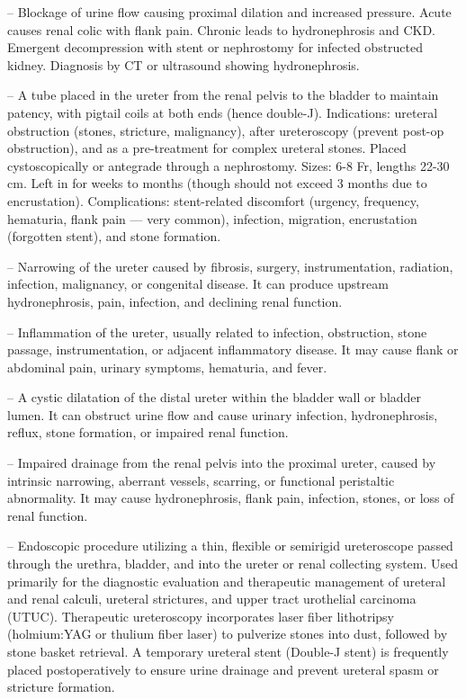 -- Blockage of urine flow causing proximal dilation and increased pressure. Acute causes renal colic with flank pain. Chronic leads to hydronephrosis and CKD. Emergent decompression with stent or nephrostomy for infected obstructed kidney. Diagnosis by CT or ultrasound showing hydronephrosis.

-- A tube placed in the ureter from the renal pelvis to the bladder to maintain patency, with pigtail coils at both ends (hence double-J). Indications: ureteral obstruction (stones, stricture, malignancy), after ureteroscopy (prevent post-op obstruction), and as a pre-treatment for complex ureteral stones. Placed cystoscopically or antegrade through a nephrostomy. Sizes: 6-8 Fr, lengths 22-30 cm. Left in for weeks to months (though should not exceed 3 months due to encrustation). Complications: stent-related discomfort (urgency, frequency, hematuria, flank pain — very common), infection, migration, encrustation (forgotten stent), and stone formation.

-- Narrowing of the ureter caused by fibrosis, surgery, instrumentation, radiation, infection, malignancy, or congenital disease. It can produce upstream hydronephrosis, pain, infection, and declining renal function.

-- Inflammation of the ureter, usually related to infection, obstruction, stone passage, instrumentation, or adjacent inflammatory disease. It may cause flank or abdominal pain, urinary symptoms, hematuria, and fever.


-- A cystic dilatation of the distal ureter within the bladder wall or bladder lumen. It can obstruct urine flow and cause urinary infection, hydronephrosis, reflux, stone formation, or impaired renal function.

-- Impaired drainage from the renal pelvis into the proximal ureter, caused by intrinsic narrowing, aberrant vessels, scarring, or functional peristaltic abnormality. It may cause hydronephrosis, flank pain, infection, stones, or loss of renal function.

-- Endoscopic procedure utilizing a thin, flexible or semirigid ureteroscope passed through the urethra, bladder, and into the ureter or renal collecting system. Used primarily for the diagnostic evaluation and therapeutic management of ureteral and renal calculi, ureteral strictures, and upper tract urothelial carcinoma (UTUC). Therapeutic ureteroscopy incorporates laser fiber lithotripsy (holmium:YAG or thulium fiber laser) to pulverize stones into dust, followed by stone basket retrieval. A temporary ureteral stent (Double-J stent) is frequently placed postoperatively to ensure urine drainage and prevent ureteral spasm or stricture formation.

